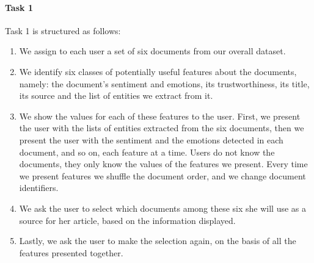 \documentclass{llncs}
\begin{document}
\paragraph{Task 1}
%
%
%
%
%
Task 1 is structured as follows:
\begin{enumerate}
\item We assign to each user a set of six documents from our overall dataset.
\item We identify six classes of potentially useful features about the documents, namely: the document's sentiment and emotions, its trustworthiness, its title, its source and the list of entities we extract from it.
\item We show the values for each of these features to the user. First, we present the user with the lists of entities extracted from the six documents, then we present the user with the sentiment and the emotions detected in each document, and so on, each feature at a time. %
Users do not know the documents, they only know the values of the features we present. Every time we present features we shuffle the document order, and we change document identifiers.
%
%
%
%
%
%
\item We ask the user to select which documents among these six she will use as a source for her article, based on the information displayed.
\item Lastly, we ask the user to make the selection again, on the basis of all the features presented together.
\end{enumerate}
\end{document}
